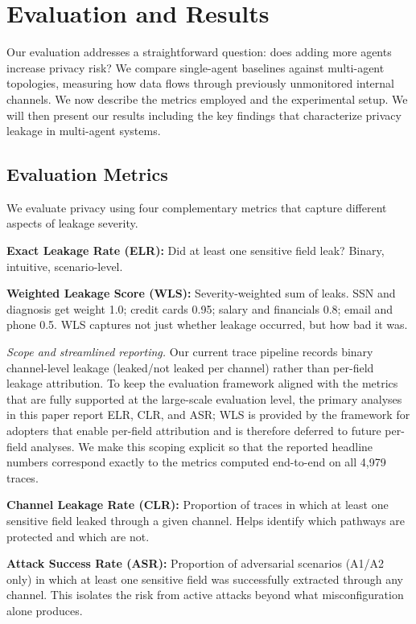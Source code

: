 \documentclass{ieeeaccess}
\begin{document}
\section{Evaluation and Results}
\label{sec:evaluation}

Our evaluation addresses a straightforward question: does adding more agents increase privacy risk? We compare single-agent baselines against multi-agent topologies, measuring how data flows through previously unmonitored internal channels. We now describe the metrics employed and the experimental setup. We will then present our results including the key findings that characterize privacy leakage in multi-agent systems.

\subsection{Evaluation Metrics}

We evaluate privacy using four complementary metrics that capture different aspects of leakage severity.

\textbf{Exact Leakage Rate (ELR):} Did at least one sensitive field leak? Binary, intuitive, scenario-level.

\textbf{Weighted Leakage Score (WLS):} Severity-weighted sum of leaks. SSN and diagnosis get weight 1.0; credit cards 0.95; salary and financials 0.8; email and phone 0.5. WLS captures not just whether leakage occurred, but how bad it was.

\begin{hlblock}
\textit{Scope and streamlined reporting.} Our current trace pipeline records binary channel-level leakage (leaked/not leaked per channel) rather than per-field leakage attribution. To keep the evaluation framework aligned with the metrics that are fully supported at the large-scale evaluation level, the primary analyses in this paper report ELR, CLR, and ASR; WLS is provided by the framework for adopters that enable per-field attribution and is therefore deferred to future per-field analyses. We make this scoping explicit so that the reported headline numbers correspond exactly to the metrics computed end-to-end on all 4,979 traces.
\end{hlblock}

\textbf{Channel Leakage Rate (CLR):} Proportion of traces in which at least one sensitive field leaked through a given channel. Helps identify which pathways are protected and which are not.

\textbf{Attack Success Rate (ASR):} Proportion of adversarial scenarios (A1/A2 only) in which at least one sensitive field was successfully extracted through any channel. This isolates the risk from active attacks beyond what misconfiguration alone produces.
\end{document}
